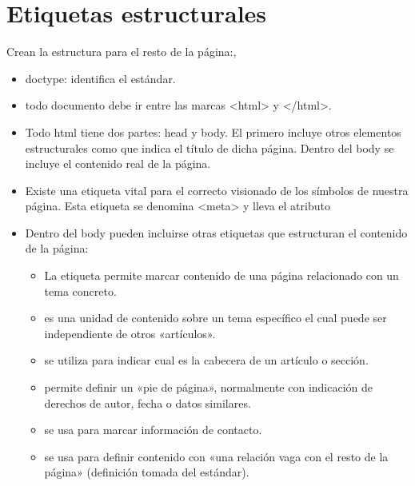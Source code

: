 \documentclass[letterpaper,10pt,spanish]{sphinxmanual}
\begin{document}
\section{Etiquetas estructurales}
\label{\detokenize{tema2:etiquetas-estructurales}}
Crean la estructura para el resto de la página:,
\begin{itemize}
\item {} 
doctype: identifica el estándar.

\item {} 
todo documento debe ir entre las marcas \textless{}html\textgreater{} y \textless{}/html\textgreater{}.

\item {} 
Todo html tiene dos partes: head y body. El primero incluye otros elementos estructurales como  que indica el título de dicha página. Dentro del body se incluye el contenido real de la página.

\item {} 
Existe una etiqueta vital para el correcto visionado de los símbolos de nuestra página. Esta etiqueta se denomina \textless{}meta\textgreater{} y lleva el atributo 

\item {} 
Dentro del body pueden incluirse otras etiquetas que estructuran el contenido de la página:
\begin{itemize}
\item {} 
La etiqueta  permite marcar contenido de una página relacionado con un tema concreto.

\item {} 
 es una unidad de contenido sobre un tema específico el cual puede ser independiente de otros «artículos».

\item {} 
 se utiliza para indicar cual es la cabecera de un artículo o sección.

\item {} 
 permite definir un «pie de página», normalmente con indicación de derechos de autor, fecha o datos similares.

\item {} 
 se usa para marcar información de contacto.

\item {} 
 se usa para definir contenido con «una relación vaga con el resto de la página» (definición tomada del estándar).


\end{itemize}
\end{itemize}
\end{document}
